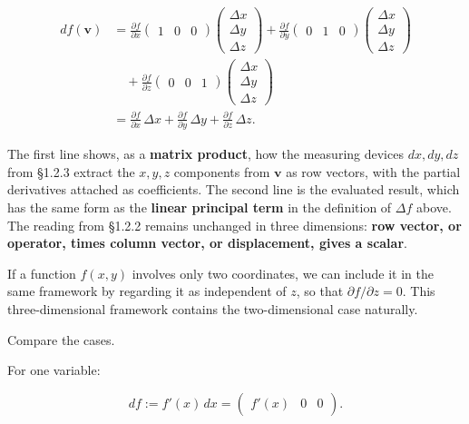 \[
\begin{aligned}
df(\mathbf{v})
&=\frac{\partial f}{\partial x}
\begin{pmatrix}1&0&0\end{pmatrix}
\begin{pmatrix}\Delta x\\\Delta y\\\Delta z\end{pmatrix}
+\frac{\partial f}{\partial y}
\begin{pmatrix}0&1&0\end{pmatrix}
\begin{pmatrix}\Delta x\\\Delta y\\\Delta z\end{pmatrix}\\
&\quad+\frac{\partial f}{\partial z}
\begin{pmatrix}0&0&1\end{pmatrix}
\begin{pmatrix}\Delta x\\\Delta y\\\Delta z\end{pmatrix}\\
&=\frac{\partial f}{\partial x}\,\Delta x+
\frac{\partial f}{\partial y}\,\Delta y+
\frac{\partial f}{\partial z}\,\Delta z.
\end{aligned}
\]

The first line shows, as a \textbf{matrix product}, how the measuring
devices \(dx,dy,dz\) from §1.2.3 extract the \(x,y,z\) components from
\(\mathbf{v}\) as row vectors, with the partial derivatives attached as
coefficients. The second line is the evaluated result, which has the
same form as the \textbf{linear principal term} in the definition of
\(\Delta f\) above. The reading from §1.2.2 remains unchanged in three
dimensions:
\textbf{row vector, or operator, times column vector, or displacement, gives a scalar}.

If a function \(f(x,y)\) involves only two coordinates, we can include
it in the same framework by regarding it as independent of \(z\), so
that \(\partial f/\partial z=0\). This three-dimensional framework
contains the two-dimensional case naturally.

Compare the cases.

For one variable:

\[
df:=f'(x)\,dx=\begin{pmatrix}f'(x)&0&0\end{pmatrix}.
\]

